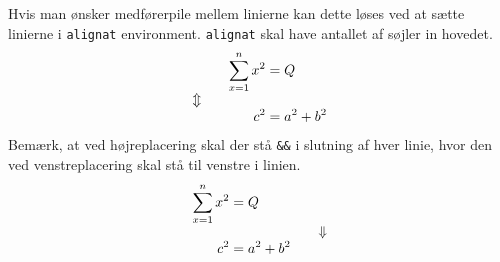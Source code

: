 \documentclass{article}
\begin{document}
Hvis man ønsker medførerpile mellem linierne kan dette løses ved at sætte linierne i \verb"alignat" environment.
\verb"alignat" skal have antallet af søjler in hovedet. 
\begin{alignat*}{2}
&&\sum_{x=1}^n x^2  &= Q\\
\ArrowBetweenLines %
&&c^2   &=  a^2+b^2
\end{alignat*}
Bemærk, at ved højreplacering skal der stå \verb"&&" i slutning af hver linie, hvor den ved venstreplacering skal stå til venstre i linien.
\begin{alignat*}{2}
\sum_{x=1}^n x^2 &= Q &&\\
\ArrowBetweenLines*[\Downarrow]
c^2 &= a^2+b^2 &&
\end{alignat*}
\end{document}
